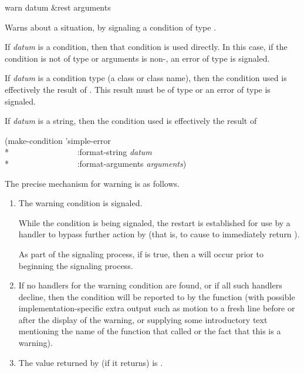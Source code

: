 \begin{defun}[Function]
warn datum &rest arguments

Warns about a situation, by signaling a condition of type .

If \emph{datum} is a condition, then that condition is used directly.  In this
case, if the condition is not of type  or arguments is
non-, an error of type  is signaled.

If \emph{datum} is a condition type (a class or class name), then the condition
used is effectively the result of . This result must be of type  or an error of
type  is signaled.

If \emph{datum} is a string, then the condition used is effectively the result
of
\begin{lisp}
(make-condition 'simple-error \\*
~~~~~~~~~~~~~~~~:format-string \emph{datum} \\*
~~~~~~~~~~~~~~~~:format-arguments \emph{arguments})
\end{lisp}

The precise mechanism for warning is as follows.
\begin{enumerate}

\item The warning condition is signaled.

  While the  condition is being signaled, the 
  restart is established for use by a handler to bypass further action by
   (that is, to cause  to immediately return ).

  As part of the signaling process, if  is true, then a  will occur prior to
  beginning the signaling process.

\item If no handlers for the warning condition are found, or if all such
  handlers decline, then the condition will be reported to 
  by the  function (with possible implementation-specific extra output
  such as motion to a fresh line before or after the display of the warning, or
  supplying some introductory text mentioning the name of the function that
  called  or the fact that this is a warning).

\item The value returned by  (if it returns) is .
\end{enumerate}
\end{defun}

